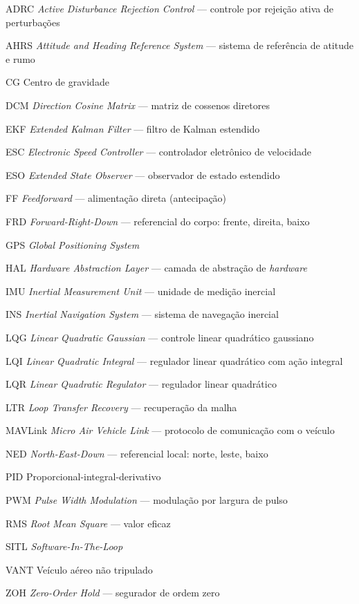 \begin{siglas}
    \item[ADRC] \textit{Active Disturbance Rejection Control} --- controle por
        rejeição ativa de perturbações
    \item[AHRS] \textit{Attitude and Heading Reference System} --- sistema de
        referência de atitude e rumo
    \item[CG] Centro de gravidade
    \item[DCM] \textit{Direction Cosine Matrix} --- matriz de cossenos diretores
    \item[EKF] \textit{Extended Kalman Filter} --- filtro de Kalman estendido
    \item[ESC] \textit{Electronic Speed Controller} --- controlador eletrônico
        de velocidade
    \item[ESO] \textit{Extended State Observer} --- observador de estado
        estendido
    \item[FF] \textit{Feedforward} --- alimentação direta (antecipação)
    \item[FRD] \textit{Forward-Right-Down} --- referencial do corpo: frente,
        direita, baixo
    \item[GPS] \textit{Global Positioning System}
    \item[HAL] \textit{Hardware Abstraction Layer} --- camada de abstração de
        \textit{hardware}
    \item[IMU] \textit{Inertial Measurement Unit} --- unidade de medição
        inercial
    \item[INS] \textit{Inertial Navigation System} --- sistema de navegação
        inercial
    \item[LQG] \textit{Linear Quadratic Gaussian} --- controle linear
        quadrático gaussiano
    \item[LQI] \textit{Linear Quadratic Integral} --- regulador linear
        quadrático com ação integral
    \item[LQR] \textit{Linear Quadratic Regulator} --- regulador linear
        quadrático
    \item[LTR] \textit{Loop Transfer Recovery} --- recuperação da malha
    \item[MAVLink] \textit{Micro Air Vehicle Link} --- protocolo de comunicação
        com o veículo
    \item[NED] \textit{North-East-Down} --- referencial local: norte, leste,
        baixo
    \item[PID] Proporcional-integral-derivativo
    \item[PWM] \textit{Pulse Width Modulation} --- modulação por largura de
        pulso
    \item[RMS] \textit{Root Mean Square} --- valor eficaz
    \item[SITL] \textit{Software-In-The-Loop}
    \item[VANT] Veículo aéreo não tripulado
    \item[ZOH] \textit{Zero-Order Hold} --- segurador de ordem zero
\end{siglas}
